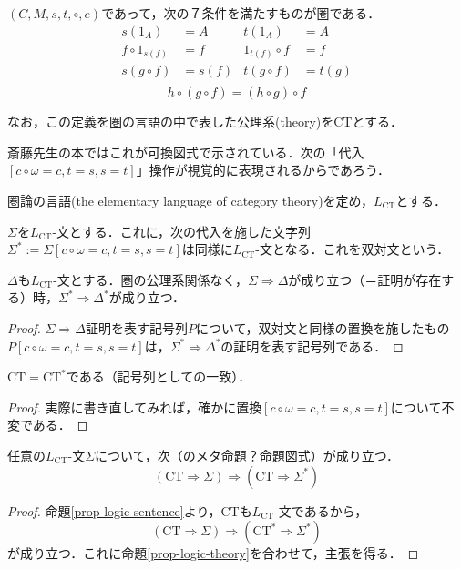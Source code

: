 \documentclass[uplatex, dvipdfmx]{jsarticle}
\begin{document}
\begin{definition*}[圏の形式的定義]
    $(C,M,s,t,\circ,e)$であって，次の７条件を満たすものが圏である．
    \begin{align*}
        s(1_A) &=A & t(1_A) &=A \\
        f\circ 1_{s(f)} &=f & 1_{t(f)}\circ f &=f \\
        s(g\circ f) &= s(f)& t(g\circ f) &= t(g) \\
    \end{align*}
    \[h\circ (g\circ f) = (h\circ g)\circ f\]

    なお，この定義を圏の言語の中で表した公理系(theory)をCTとする．
\end{definition*}
斎藤先生の本ではこれが可換図式で示されている．次の「代入$[c\circ\omega =c, t=s,s=t]$」操作が視覚的に表現されるからであろう．

\begin{definition*}[圏の言語]
    圏論の言語(the elementary language of category theory)を定め，$L_{\mathrm{CT}}$とする．
\end{definition*}

\begin{definition*}[双対文]
    $\Sigma$を$L_{\mathrm{CT}}$-文とする．これに，次の代入を施した文字列$\Sigma^*:=\Sigma[c\circ\omega =c, t=s,s=t]$は同様に$L_{\mathrm{CT}}$-文となる．これを双対文という．
\end{definition*}

\begin{proposition*}\label{prop-logic-sentence}
    $\Delta$も$L_{\mathrm{CT}}$-文とする．圏の公理系関係なく，$\Sigma\Rightarrow\Delta$が成り立つ（＝証明が存在する）時，$\Sigma^*\Rightarrow\Delta^*$が成り立つ．
\end{proposition*}
\begin{proof}
    $\Sigma\Rightarrow\Delta$証明を表す記号列$P$について，双対文と同様の置換を施したもの$P[c\circ\omega =c, t=s,s=t]$は，$\Sigma^*\Rightarrow\Delta^*$の証明を表す記号列である．
\end{proof}

\begin{proposition*}\label{prop-logic-theory}
    $\mathrm{CT}=\mathrm{CT}^*$である（記号列としての一致）．
\end{proposition*}
\begin{proof}
    実際に書き直してみれば，確かに置換$[c\circ\omega =c, t=s,s=t]$について不変である．
\end{proof}

\begin{proposition}
    任意の$L_{\mathrm{CT}}$-文$\Sigma$について，次（のメタ命題？命題図式）が成り立つ．
    \[ (\mathrm{CT}\Rightarrow\Sigma) \Rightarrow (\mathrm{CT}\Rightarrow\Sigma^*) \]
\end{proposition}
\begin{proof}
    命題\ref{prop-logic-sentence}より，CTも$L_{\mathrm{CT}}$-文であるから，
    \[ (\mathrm{CT}\Rightarrow\Sigma) \Rightarrow (\mathrm{CT}^*\Rightarrow\Sigma^*) \]
    が成り立つ．これに命題\ref{prop-logic-theory}を合わせて，主張を得る．
\end{proof}
\end{document}
